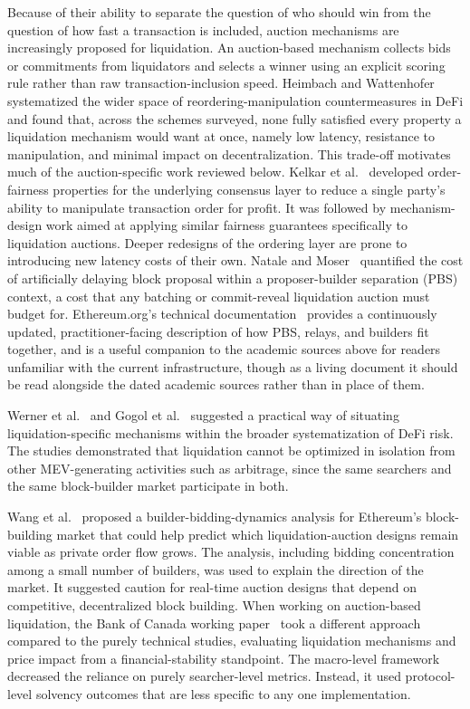 \documentclass{llncs}
\begin{document}
Because of their ability to separate the question of who should win from
the question of how fast a transaction is included, auction mechanisms
are increasingly proposed for liquidation. An auction-based mechanism
collects bids or commitments from liquidators and selects a winner using
an explicit scoring rule rather than raw transaction-inclusion speed.
Heimbach and Wattenhofer~\cite{heimbach2022sok} systematized the wider
space of reordering-manipulation countermeasures in DeFi and found that,
across the schemes surveyed, none fully satisfied every property a
liquidation mechanism would want at once, namely low latency, resistance
to manipulation, and minimal impact on decentralization. This trade-off
motivates much of the auction-specific work reviewed below.
Kelkar et al.~\cite{kelkar2020order} developed order-fairness properties
for the underlying consensus layer to reduce a single party's ability to
manipulate transaction order for profit. It was followed by
mechanism-design work aimed at applying similar fairness guarantees
specifically to liquidation auctions. Deeper redesigns of the ordering
layer are prone to introducing new latency costs of their own.
Natale and Moser~\cite{natale2023cost} quantified the cost of
artificially delaying block proposal within a proposer-builder separation
(PBS) context, a cost that any batching or commit-reveal liquidation
auction must budget for. Ethereum.org's technical
documentation~\cite{ethereumorg} provides a continuously updated,
practitioner-facing description of how PBS, relays, and builders fit
together, and is a useful companion to the academic sources above for
readers unfamiliar with the current infrastructure, though as a living
document it should be read alongside the dated academic sources rather
than in place of them.

Werner et al.~\cite{werner2021sok} and Gogol et al.~\cite{gogol2024sok}
suggested a practical way of situating liquidation-specific mechanisms
within the broader systematization of DeFi risk. The studies
demonstrated that liquidation cannot be optimized in isolation from
other MEV-generating activities such as arbitrage, since the same
searchers and the same block-builder market participate in both.

Wang et al.~\cite{wang2024private} proposed a builder-bidding-dynamics
analysis for Ethereum's block-building market that could help predict
which liquidation-auction designs remain viable as private order flow
grows. The analysis, including bidding concentration among a small
number of builders, was used to explain the direction of the market. It
suggested caution for real-time auction designs that depend on
competitive, decentralized block building. When working on
auction-based liquidation, the Bank of Canada working
paper~\cite{bankofcanada2025} took a different approach compared to the
purely technical studies, evaluating liquidation mechanisms and price
impact from a financial-stability standpoint. The macro-level framework
decreased the reliance on purely searcher-level metrics. Instead, it
used protocol-level solvency outcomes that are less specific to any one
implementation.
\end{document}
